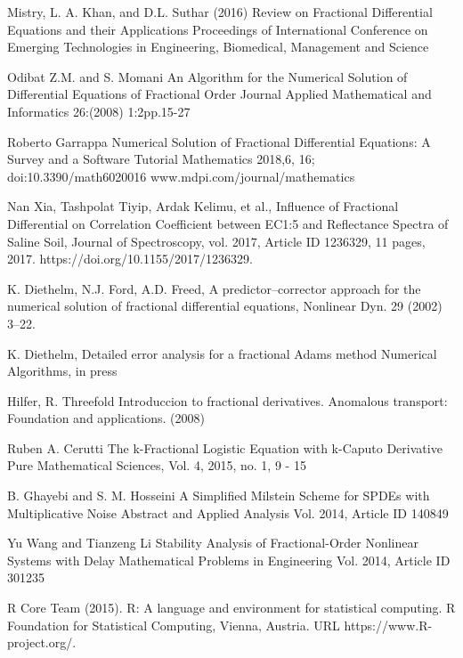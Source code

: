 \begin{thebibliography}{00}
 Mistry, L. A. Khan, and D.L. Suthar (2016)
\newblock Review on Fractional Differential Equations and their Applications
\newblock Proceedings of International Conference on Emerging Technologies in Engineering, Biomedical, Management and Science 

 Odibat Z.M. and S. Momani
\newblock An Algorithm for the Numerical Solution of Differential Equations of Fractional Order
\newblock Journal Applied Mathematical and Informatics 26:(2008) 1:2pp.15-27

 Roberto Garrappa
\newblock Numerical Solution of Fractional Differential Equations: A Survey and a Software Tutorial
\newblock Mathematics 2018,6, 16; doi:10.3390/math6020016 www.mdpi.com/journal/mathematics

 Nan Xia, Tashpolat Tiyip, Ardak Kelimu, et al., 
\newblock Influence of Fractional Differential on Correlation Coefficient between EC1:5 and Reflectance Spectra of Saline Soil,
\newblock Journal of Spectroscopy, vol. 2017, Article ID 1236329, 11 pages, 2017. https://doi.org/10.1155/2017/1236329.

K. Diethelm, N.J. Ford, A.D. Freed, 
\newblock A predictor–corrector approach for the numerical solution of fractional differential equations, 
\newblock Nonlinear Dyn. 29 (2002) 3–22.
 
 K. Diethelm, 
\newblock Detailed error analysis for a fractional Adams method
\newblock Numerical Algorithms, in press

 Hilfer,  R.
\newblock Threefold  Introduccion  to  fractional  derivatives.  
\newblock Anomalous transport:  Foundation and applications. (2008)

 Ruben A. Cerutti
\newblock The k-Fractional Logistic Equation with k-Caputo Derivative
\newblock Pure Mathematical Sciences, Vol.  4, 2015, no.  1, 9 - 15

B. Ghayebi and S. M. Hosseini
\newblock A Simplified Milstein Scheme for SPDEs with Multiplicative Noise
\newblock Abstract and Applied Analysis Vol. 2014, Article ID 140849

Yu Wang and Tianzeng Li
\newblock Stability Analysis of Fractional-Order Nonlinear Systems with Delay
\newblock Mathematical Problems in Engineering Vol. 2014, Article ID 301235

R Core Team (2015). 
\newblock R: A language and environment for statistical computing. R Foundation for Statistical Computing, Vienna, Austria.
\newblock URL https://www.R-project.org/.

\end{thebibliography}



